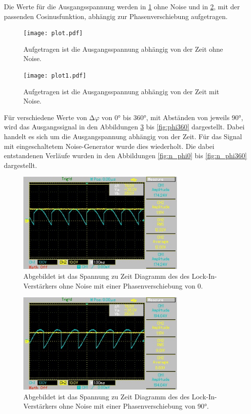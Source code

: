 Die Werte für die Ausgangsspannung werden in \ref{fig:plot} ohne Noise und in \ref{fig:plot1}, mit der passenden Cosinusfunktion, abhängig zur Phasenverschiebung aufgetragen.

\begin{figure}[H]
  \centering
  \texttt{[image: plot.pdf]}
  \caption{Aufgetragen ist die Ausgangsspannung abhängig von der Zeit ohne Noise.}
  \label{fig:plot}
\end{figure}

\begin{figure}[H]
  \centering
  \texttt{[image: plot1.pdf]}
  \caption{Aufgetragen ist die Ausgangsspannung abhängig von der Zeit mit Noise.}
  \label{fig:plot1}
\end{figure}



Für verschiedene Werte von $\increment \varphi$ von 0° bis 360°, mit Abständen von jeweils 90°, wird das Ausgangssignal in den Abbildungen \ref{fig:phi0} bis \ref{fig:phi360} dargestellt.
Dabei handelt es sich um die Ausgangspannung abhängig von der Zeit. 
Für das Signal mit eingeschaltetem Noise-Generator wurde dies wiederholt.
Die dabei entstandenen Verläufe wurden in den Abbildungen \ref{fig:n_phi0} bis \ref{fig:n_phi360} dargestellt.

\begin{figure}[H]
  \centering
  \includegraphics[height=5cm]{Bilder/phi0.jpg}
  \caption{Abgebildet ist das Spannung zu Zeit Diagramm des des Lock-In-Verstärkers ohne Noise mit einer Phasenverschiebung von 0.}
  \label{fig:phi0}
\end{figure}

\begin{figure}[H]
  \centering
  \includegraphics[height=5cm]{Bilder/phi90.jpg}
  \caption{Abgebildet ist das Spannung zu Zeit Diagramm des des Lock-In-Verstärkers ohne Noise mit einer Phasenverschiebung von 90°.}
  \label{fig:phi90}
\end{figure}


